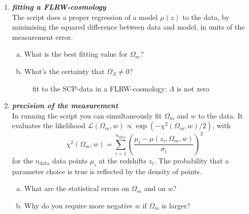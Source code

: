 \documentclass[a4paper,12pt]{article}
\newcommand{\question}[1]{\textbf{\textit{#1}}}
\begin{document}
\begin{enumerate}
\item \question{fitting a FLRW-cosmology}\\
The script  does a proper regression of a model $\mu(z)$ to the data, by minimising the squared difference between data and model, in units of the measurement error. 
\begin{enumerate}[(a)]
\item{What is the best fitting value for $\Omega_m$?}
\item{What's the certainty that $\Omega_\Lambda\neq 0$?}
\end{enumerate}

\begin{figure}[h]
\begin{center}
\caption{fit to the SCP-data in a FLRW-cosmology: $\Lambda$ is not zero}
\end{center}
\end{figure}

\item \question{precision of the measurement}\\
In running the script  you can simultaneously fit $\Omega_m$ and $w$ to the data. It evaluates the likelihood $\mathcal{L}(\Omega_m,w)\propto \exp(-\chi^2(\Omega_m,w)/2)$, with 
\begin{equation}
\chi^2(\Omega_m,w) = \sum_{i=1}^{n_\mathrm{data}}\left(\frac{\mu_i-\mu(z_i,\Omega_m,w)}{\sigma_i}\right)^2
\end{equation}
for the $n_\mathrm{data}$ data points $\mu_i$ at the redshifts $z_i$. The probability that a parameter choice is true is reflected by the density of points.
\begin{enumerate}[(a)]
\item{What are the statistical errors on $\Omega_m$ and on $w$?}
\item{Why do you require more negative $w$ if $\Omega_m$ is larger?}
\end{enumerate}


\end{enumerate}
\end{document}
